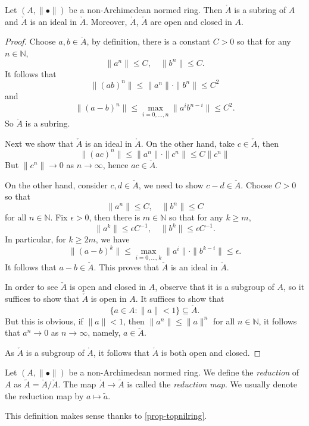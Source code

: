 \begin{proposition}\label{prop-topnilring}
    Let $(A,\|\bullet\|)$ be a non-Archimedean normed ring. Then $\mathring{A}$ is a subring of $A$ and $\check{A}$ is an ideal in $\mathring{A}$. Moreover, $\mathring{A}$, $\check{A}$ are open and closed in $A$.
\end{proposition}
\begin{proof}
    Choose $a,b\in \mathring{A}$, by definition, there is a constant $C>0$ so that for any $n\in \mathbb{N}$,
    \[
      \|a^n\|\leq C,\quad \|b^n\|\leq C.  
    \]
    It follows that
    \[
      \|(ab)^n\|\leq \|a^n\|\cdot \|b^n\|\leq C^2  
    \]
    and
    \[
      \|(a-b)^n\|\leq  \max_{i=0,\ldots,n}\|a^ib^{n-i}\|\leq C^2. 
    \]
    So $\mathring{A}$ is a subring.

    Next we show that $\check{A}$ is an ideal in $\mathring{A}$.
    On the other hand, take $c\in \check{A}$, then
    \[
        \|(ac)^n\|\leq \|a^n\|\cdot \|c^n\|\leq C\|c^n\|  
    \]
    But $\|c^n\|\to 0$ as $n\to \infty$, hence $ac\in \check{A}$. 
    
    On the other hand, consider $c,d\in \check{A}$, we need to show $c-d\in \check{A}$. Choose $C>0$ so that
    \[
        \|a^n\|\leq C,\quad \|b^n\|\leq C  
    \]
    for all $n\in \mathbb{N}$. Fix $\epsilon>0$, then there is $m\in \mathbb{N}$ so that for any $k\geq m$,
    \[
        \|a^k\|\leq \epsilon C^{-1},\quad   \|b^k\|\leq \epsilon C^{-1}.
    \]
    In particular, for $k\geq 2m$, we have
    \[
        \|(a-b)^k\|\leq \max_{i=0,\ldots,k} \|a^i\|\cdot\|b^{k-i}\|\leq \epsilon.
    \]
    It follows that $a-b\in \check{A}$. 
    This proves that $\check{A}$ is an ideal in $\mathring{A}$.

    In order to see $\check{A}$ is open and closed in $A$, observe that it is a subgroup of $A$, so it suffices to show that $\check{A}$ is open in $A$. It suffices to show that
    \[
        \{a\in A:\|a\|<1\}\subseteq  \check{A}. 
    \]
    But this is obvious, if $\|a\|<1$, then $\|a^n\|\leq \|a\|^n$ for all $n\in \mathbb{N}$, it follows that $a^n\to 0$ as $n\to\infty$, namely, $a\in \check{A}$.

    As $\check{A}$ is a subgroup of $\mathring{A}$, it follows that $\mathring{A}$ is both open and closed.
\end{proof}

\begin{definition}\label{def-reduction}
    Let $(A,\|\bullet\|)$ be a non-Archimedean normed ring. We define the \emph{reduction} of $A$ as $\tilde{A}=\mathring{A}/\check{A}$. The map $\mathring{A}\rightarrow \tilde{A}$ is called the \emph{reduction map}. We usually denote the reduction map by $a\mapsto \tilde{a}$.
\end{definition}
This definition makes sense thanks to \cref{prop-topnilring}.

